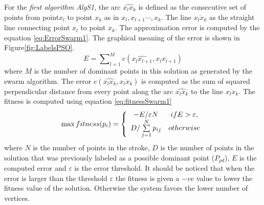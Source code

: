 \documentclass{article}
\begin{document}
For the \textit{first algorithm \textsl{AlgS1}}, the arc $\widehat{x_lx_k}$ is defined as the consecutive set of points from point$x_l$ to point $x_{k}$ as in $x_l,x_{l+1} \cdots,x_k$. The line $\overline{x_l x_k} $ as the straight line connecting point $x_l$ to point $x_k$. The approximation error is computed by the equation \ref{eq:ErrorSwarm1}. The graphical meaning of the error is shown in Figure\ref{fig:LabelsPSO}.
\small \begin{equation}
E=\sum\nolimits_{l = 1}^M e ( \widehat{x_lx_{l+1}},\overline{x_l x_{l+1}})
\label{eq:ErrorSwarm1}
\end{equation} 
\normalsize
where $M$ is the number of dominant points in this solution as generated by the swarm algorithm. The error $e ( \widehat{x_lx_k},\overline{x_l x_k})$ is computed as the sum of squared perpendicular distance from every point along the arc $\widehat{x_lx_k}$ to the line $\overline{x_l x_k}$. The fitness is computed using equation \ref{eq:fitnessSwarm1}
\small \begin{equation}
\max fitness(p_i ) = \left\{ {\begin{array}{*{20}c}
   { - E/\varepsilon N} & {ifE > \varepsilon ,}  \\
   {D/\sum\limits_{j = 1}^N {p_{ij} } } & {otherwise}  \\
\end{array}} \right.
\label{eq:fitnessSwarm1}
\end{equation}\normalsize where $N$ is the number of points in the stroke, $D$ is the number of points in the solution that was previously labeled as a possible dominant point ($P_{pd}$), $E$ is the computed error and $\varepsilon$ is the error threshold. It should be noticed that when the error is larger than the threshold $\varepsilon$ the fitness is given a $-ve$ value to lower the fitness value of the solution. Otherwise the system favors the lower number of vertices.
\end{document}
